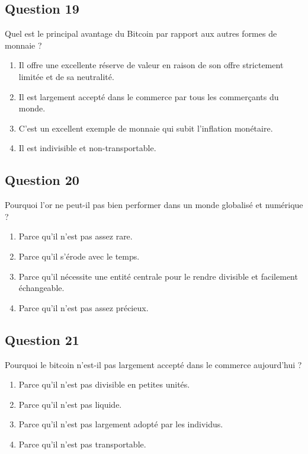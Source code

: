 \documentclass[12pt,a4paper]{article}
\begin{document}
\bigskip


\subsection*{Question 19}
Quel est le principal avantage du Bitcoin par rapport aux autres formes de monnaie ?

\begin{enumerate}[label=\Alph*., leftmargin=*]
\item Il offre une excellente réserve de valeur en raison de son offre strictement limitée et de sa neutralité.
\item Il est largement accepté dans le commerce par tous les commerçants du monde.
\item C'est un excellent exemple de monnaie qui subit l'inflation monétaire.
\item Il est indivisible et non-transportable.
\end{enumerate}

\bigskip


\subsection*{Question 20}
Pourquoi l'or ne peut-il pas bien performer dans un monde globalisé et numérique ?

\begin{enumerate}[label=\Alph*., leftmargin=*]
\item Parce qu'il n'est pas assez rare.
\item Parce qu'il s'érode avec le temps.
\item Parce qu'il nécessite une entité centrale pour le rendre divisible et facilement échangeable.
\item Parce qu'il n'est pas assez précieux.
\end{enumerate}

\bigskip


\subsection*{Question 21}
Pourquoi le bitcoin n'est-il pas largement accepté dans le commerce aujourd'hui ?

\begin{enumerate}[label=\Alph*., leftmargin=*]
\item Parce qu'il n'est pas divisible en petites unités.
\item Parce qu'il n'est pas liquide.
\item Parce qu'il n'est pas largement adopté par les individus.
\item Parce qu'il n'est pas transportable.
\end{enumerate}
\end{document}
